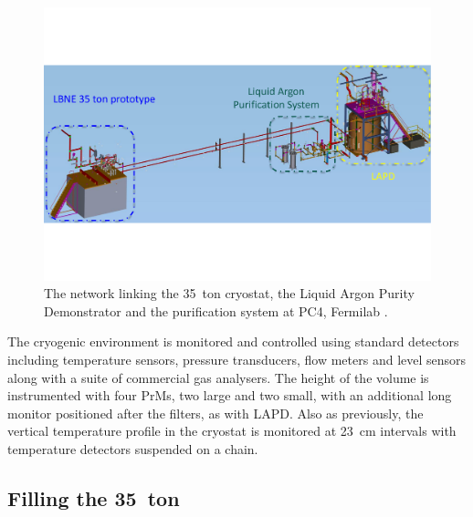 \begin{figure}
  \centering
  \includegraphics[width=14cm]{35tonLAPD.pdf}
  \caption[The network linking the 35~ton cryostat, the Liquid Argon Purity Demonstrator and the purification system at PC4, Fermilab.]{The network linking the 35~ton cryostat, the Liquid Argon Purity Demonstrator and the purification system at PC4, Fermilab \cite{35tonPhaseI2014}.}
  \label{fig:35tonLAPD}
\end{figure}

The cryogenic environment is monitored and controlled using standard detectors including temperature sensors, pressure transducers, flow meters and level sensors along with a suite of commercial gas analysers.  The height of the volume is instrumented with four PrMs, two large and two small, with an additional long monitor positioned after the filters, as with LAPD.  Also as previously, the vertical temperature profile in the cryostat is monitored at 23~cm intervals with temperature detectors suspended on a chain.

\subsection{Filling the 35~ton}\label{sec:35tonFilling}

